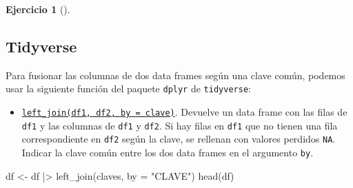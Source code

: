 \documentclass[
  a4paper,
]{scrreport}
\newenvironment{Shaded}{\begin{snugshade}}{\end{snugshade}}
\newcommand{\AttributeTok}[1]{\textcolor[rgb]{0.40,0.45,0.13}{#1}}
\newcommand{\FunctionTok}[1]{\textcolor[rgb]{0.28,0.35,0.67}{#1}}
\newcommand{\NormalTok}[1]{\textcolor[rgb]{0.00,0.23,0.31}{#1}}
\newcommand{\OtherTok}[1]{\textcolor[rgb]{0.00,0.23,0.31}{#1}}
\newcommand{\SpecialCharTok}[1]{\textcolor[rgb]{0.37,0.37,0.37}{#1}}
\newcommand{\StringTok}[1]{\textcolor[rgb]{0.13,0.47,0.30}{#1}}
\providecommand{\tightlist}{%
  \setlength{\itemsep}{0pt}\setlength{\parskip}{0pt}}\usepackage{longtable,booktabs,array}
\theoremstyle{definition}
\newtheorem{exercise}{Ejercicio}[chapter]
\theoremstyle{remark}
\begin{document}
\begin{exercise}[]
\begin{enumerate}
\begin{tcolorbox}
  \section{Tidyverse}

  Para fusionar las columnas de dos data frames según una clave común,
  podemos usar la siguiente función del paquete \texttt{dplyr} de
  \texttt{tidyverse}:

  \begin{itemize}
  \tightlist
  \item
    \href{https://dtplyr.tidyverse.org/reference/left_join.dtplyr_step.html}{\texttt{left\_join(df1,\ df2,\ by\ =\ clave)}}.
    Devuelve un data frame con las filas de \texttt{df1} y las columnas
    de \texttt{df1} y \texttt{df2}. Si hay filas en \texttt{df1} que no
    tienen una fila correspondiente en \texttt{df2} según la clave, se
    rellenan con valores perdidos \texttt{NA}. Indicar la clave común
    entre los dos data frames en el argumento \texttt{by}.
  \end{itemize}

\begin{Shaded}
\begin{Highlighting}[]
\NormalTok{df }\OtherTok{\textless{}{-}}\NormalTok{ df }\SpecialCharTok{|\textgreater{}} \FunctionTok{left\_join}\NormalTok{(claves, }\AttributeTok{by =} \StringTok{"CLAVE"}\NormalTok{)}
\FunctionTok{head}\NormalTok{(df)}
\end{Highlighting}
\end{Shaded}


\end{tcolorbox}
\end{enumerate}
\end{exercise}
\end{document}
